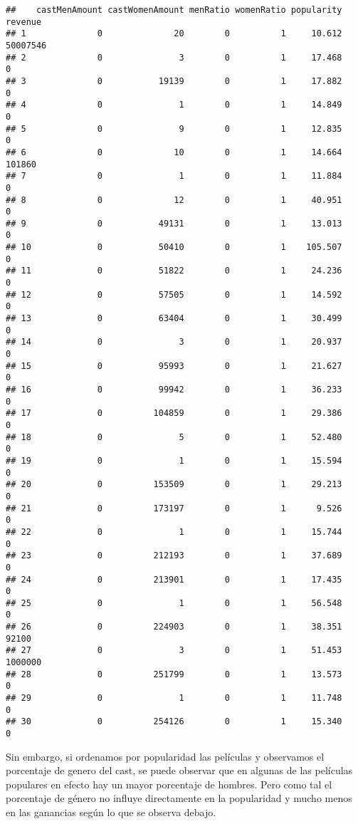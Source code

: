 \documentclass[
]{article}
\begin{document}
\begin{verbatim}
##    castMenAmount castWomenAmount menRatio womenRatio popularity  revenue
## 1              0              20        0          1     10.612 50007546
## 2              0               3        0          1     17.468        0
## 3              0           19139        0          1     17.882        0
## 4              0               1        0          1     14.849        0
## 5              0               9        0          1     12.835        0
## 6              0              10        0          1     14.664   101860
## 7              0               1        0          1     11.884        0
## 8              0              12        0          1     40.951        0
## 9              0           49131        0          1     13.013        0
## 10             0           50410        0          1    105.507        0
## 11             0           51822        0          1     24.236        0
## 12             0           57505        0          1     14.592        0
## 13             0           63404        0          1     30.499        0
## 14             0               3        0          1     20.937        0
## 15             0           95993        0          1     21.627        0
## 16             0           99942        0          1     36.233        0
## 17             0          104859        0          1     29.386        0
## 18             0               5        0          1     52.480        0
## 19             0               1        0          1     15.594        0
## 20             0          153509        0          1     29.213        0
## 21             0          173197        0          1      9.526        0
## 22             0               1        0          1     15.744        0
## 23             0          212193        0          1     37.689        0
## 24             0          213901        0          1     17.435        0
## 25             0               1        0          1     56.548        0
## 26             0          224903        0          1     38.351    92100
## 27             0               3        0          1     51.453  1000000
## 28             0          251799        0          1     13.573        0
## 29             0               1        0          1     11.748        0
## 30             0          254126        0          1     15.340        0
\end{verbatim}

Sin embargo, si ordenamos por popularidad las películas y observamos el
porcentaje de genero del cast, se puede observar que en algunas de las
películas populares en efecto hay un mayor porcentaje de hombres. Pero
como tal el porcentaje de género no influye directamente en la
popularidad y mucho menos en las ganancias según lo que se observa
debajo.
\end{document}
